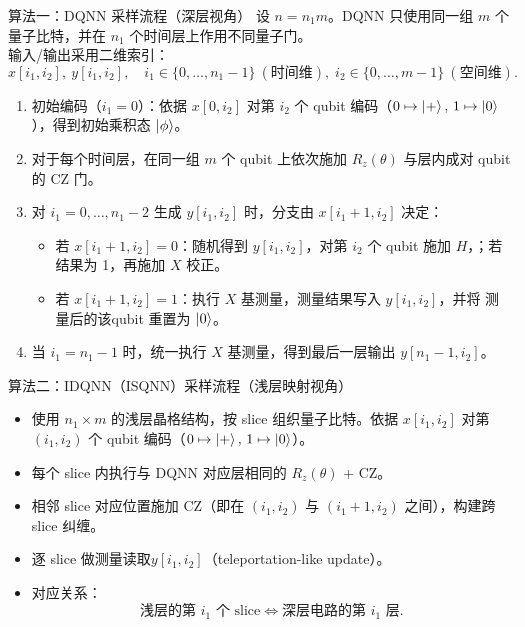 \documentclass[aspectratio=169]{beamer}
\begin{document}
\begin{frame}{算法一：DQNN 采样流程（深层视角）}
  设 $n=n_1m$。DQNN 只使用同一组 $m$ 个量子比特，并在 $n_1$ 个时间层上作用不同量子门。\\[0.2em]
  输入/输出采用二维索引：
  \[
    x[i_1,i_2],~y[i_1,i_2],\quad
    i_1\in\{0,\dots,n_1-1\}~(\text{时间维}),\;
    i_2\in\{0,\dots,m-1\}~(\text{空间维}).
  \]
  \begin{enumerate}
    \item 初始编码（$i_1=0$）：依据 $x[0,i_2]$ 对第 $i_2$ 个 qubit 编码（$0\mapsto\ket{+},\,1\mapsto\ket{0}$），得到初始乘积态 $\ket{\phi}$。
    \item 对于每个时间层，在同一组 $m$ 个 qubit 上依次施加 $R_z(\theta)$ 与层内成对 qubit 的 CZ 门。
    \item 对 $i_1=0,\dots,n_1-2$ 生成 $y[i_1,i_2]$ 时，分支由 $x[i_1+1,i_2]$ 决定：
    \begin{itemize}
      \item 若 $x[i_1+1,i_2]=0$：随机得到 $y[i_1,i_2]$，对第 $i_2$ 个 qubit 施加 $H$，；若结果为 1，再施加 $X$ 校正。
      \item 若 $x[i_1+1,i_2]=1$：执行 $X$ 基测量，测量结果写入 $y[i_1,i_2]$，并将 测量后的该qubit 重置为 $\ket{0}$。
    \end{itemize}
    \item 当 $i_1=n_1-1$ 时，统一执行 $X$ 基测量，得到最后一层输出 $y[n_1-1,i_2]$。
  \end{enumerate}
\end{frame}

\begin{frame}{算法二：IDQNN（ISQNN）采样流程（浅层映射视角）}
  \begin{itemize}
    \item 使用 $n_1\times m$ 的浅层晶格结构，按 slice 组织量子比特。依据 $x[i_1,i_2]$ 对第 $(i_1,i_2)$ 个 qubit 编码（$0\mapsto\ket{+},\,1\mapsto\ket{0}$）。
    \item 每个 slice 内执行与 DQNN 对应层相同的 $R_z(\theta)$ + CZ。
    \item 相邻 slice 对应位置施加 CZ（即在 $(i_1,i_2)$ 与 $(i_1+1,i_2)$ 之间），构建跨 slice 纠缠。
    \item 逐 slice 做测量读取$y[i_1,i_2]$（teleportation-like update）。
    \item 对应关系：
    \[
      \text{浅层的第 }i_1\text{ 个 slice} \Longleftrightarrow
      \text{深层电路的第 }i_1\text{ 层}.
    \]
  \end{itemize}
\end{frame}
\end{document}
